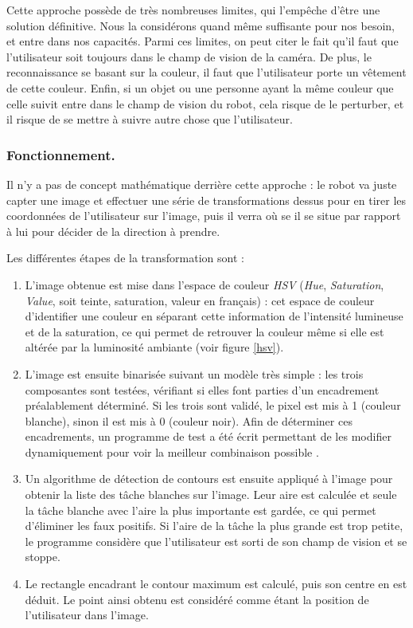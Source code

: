 \documentclass{article}
\begin{document}
Cette approche possède de très nombreuses limites, qui l'empêche d'être une solution définitive. Nous la considérons quand même suffisante pour nos besoin, et entre dans nos capacités. Parmi ces limites, on peut citer le fait qu'il faut que l'utilisateur soit toujours dans le champ de vision de la caméra. De plus, le reconnaissance se basant sur la couleur, il faut que l'utilisateur porte un vêtement de cette couleur. Enfin, si un objet ou une personne ayant la même couleur que celle suivit entre dans le champ de vision du robot, cela risque de le perturber, et il risque de se mettre à suivre autre chose que l'utilisateur.

\subsubsection{Fonctionnement.}
Il n'y a pas de concept mathématique derrière cette approche : le robot va juste capter une image et effectuer une série de transformations dessus pour en tirer les coordonnées de l'utilisateur sur l'image, puis il verra où se il se situe par rapport à lui pour décider de la direction à prendre.

Les différentes étapes de la transformation sont : \begin{enumerate}
    \item L'image obtenue est mise dans l'espace de couleur \emph{HSV} (\emph{Hue}, \emph{Saturation}, \emph{Value}, soit teinte, saturation, valeur en français) : cet espace de couleur d'identifier une couleur en séparant cette information de l'intensité lumineuse et de la saturation, ce qui permet de retrouver la couleur même si elle est altérée par la luminosité ambiante (voir figure \ref{hsv}).
    \item L'image est ensuite binarisée suivant un modèle très simple : les trois composantes sont testées, vérifiant si elles font parties d'un encadrement préalablement déterminé. Si les trois sont validé, le pixel est mis à 1 (couleur blanche), sinon il est mis à 0 (couleur noir). Afin de déterminer ces encadrements, un programme de test a été écrit permettant de les modifier dynamiquement pour voir la meilleur combinaison possible \cite{ppefollow}.
    \item Un algorithme de détection de contours est ensuite appliqué à l'image pour obtenir la liste des tâche blanches sur l'image. Leur aire est calculée et seule la tâche blanche avec l'aire la plus importante est gardée, ce qui permet d'éliminer les faux positifs. Si l'aire de la tâche la plus grande est trop petite, le programme considère que l'utilisateur est sorti de son champ de vision et se stoppe.
    \item Le rectangle encadrant le contour maximum est calculé, puis son centre en est déduit. Le point ainsi obtenu est considéré comme étant la position de l'utilisateur dans l'image.
\end{enumerate}
\end{document}
